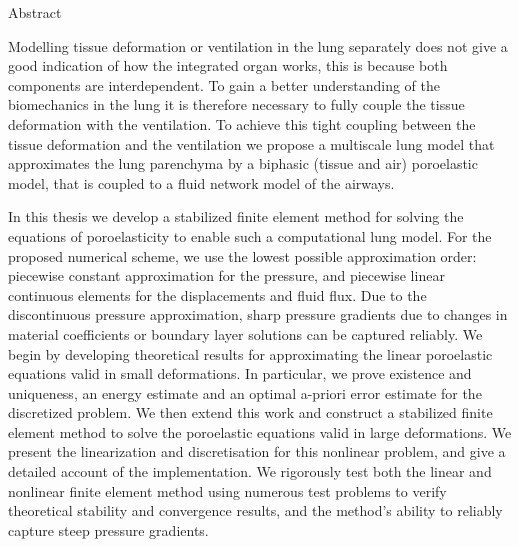 \begin{comment}

{
\Large
\noindent\makebox[0in][l]{\xauthor}\hfill\makebox[6in][r]{Doctor of
Philosophy} \vskip 2pt
\noindent{\xcollege}\hfill\makebox[4.9in][r]{\xterm}
}

\vskip 1cm

{
\Large \bf
\begin{center}
{\xtitle}
\end{center}
}
\end{comment}

{
\large\bf
\begin{center}
Abstract
\end{center}
}
%
\noindent Modelling tissue deformation or ventilation in the lung separately does not give a good indication of how the integrated organ works, this is because both components are interdependent. To gain a better understanding of the biomechanics in the lung it is therefore necessary to fully couple the tissue deformation with the ventilation. To achieve this tight coupling between the tissue deformation and the ventilation we propose a multiscale lung model that approximates the lung parenchyma by a biphasic (tissue and air) poroelastic model, that is coupled to a fluid network model of the airways. 

In this thesis we develop a stabilized finite element method for solving the equations of poroelasticity to enable such a computational lung model. For the proposed numerical scheme, we use the lowest possible approximation order: piecewise constant approximation for the pressure, and piecewise linear continuous elements for the displacements and fluid flux. Due to the discontinuous pressure approximation, sharp pressure gradients due to changes in material coefficients or boundary layer solutions can be captured reliably. We begin by developing theoretical results for approximating the linear poroelastic equations valid in small deformations. In particular, we prove existence and uniqueness, an energy estimate and an optimal a-priori error estimate for the discretized problem. 
%
%
%
We then extend this work and construct a stabilized finite element method to solve the poroelastic equations valid in large deformations. We present the linearization and discretisation for this nonlinear problem, and give a detailed account of the implementation. We rigorously test both the linear and nonlinear finite element method using numerous test problems to verify theoretical stability and convergence results, and the method's ability to reliably capture steep pressure gradients. 

